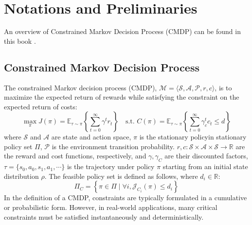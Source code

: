
\section{Notations and Preliminaries}

An overview of Constrained Markov Decision Process (CMDP) can be found in this book \cite{Altman:2021}.

\subsection{Constrained Markov Decision Process}

The constrained Markov decision process (CMDP), $\mathcal{M} = \langle \mathcal{S}, \mathcal{A}, \mathcal{P}, r, c \rangle$, is to maximize the expected return of rewards while satisfying the constraint on the expected return of costs:
\begin{equation}
	\max_\pi J(\pi) 
	= \mathbb{E}_{\tau \sim \pi} \left\{\sum^\infty_{t = 0} \gamma^t r_t\right\} 
	\quad \text{s.t. } 
	C(\pi) = \mathbb{E}_{\tau \sim \pi} \left\{\sum^\infty_{t = 0} \gamma^t_c c_t \leq d \right\}
\end{equation}
where $\mathcal{S}$ and $\mathcal{A}$ are state and action space, $\pi$ is the stationary policy\footnotemark in stationary policy set $\Pi$, $\mathcal{P}$ is the environment transition probability.
$r, c: \mathcal{S} \times \mathcal{A} \times \mathcal{S} \rightarrow \mathbb{R}$ are the reward and cost functions, respectively,
and $\gamma, \gamma_C$ are their discounted factors, $\tau = \{s_0, a_0, s_1, a_1, \cdots\}$ is the trajectory under policy $\pi$ starting from an initial state distribution $\rho$.
The feasible policy set is defined as follows, where $d_i \in \mathbb{R}$:
\begin{equation}
	\Pi_{C} = \left\{ \pi \in \Pi \mid \forall i, \mathcal{J}_{C_{i}}(\pi) \leq d_{i} \right\}
\end{equation}
In the definition of a CMDP, constraints are typically formulated in a cumulative or probabilistic form.
However, in real-world applications, many critical constraints must be satisfied instantaneously and deterministically.

